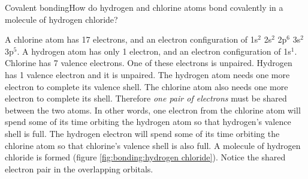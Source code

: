 \begin{wex}{Covalent bonding}{How do hydrogen and chlorine atoms bond covalently in a molecule of hydrogen chloride?}{
A chlorine atom has 17 electrons, and an electron configuration of 1s$^{2}$ 2s$^{2}$ 2p$^{6}$ 3s$^{2}$ 3p$^{5}$. A hydrogen atom has only 1 electron, and an electron configuration of 1s$^{1}$.
Chlorine has 7 valence electrons. One of these electrons is unpaired. Hydrogen has 1 valence electron and it is unpaired.
The hydrogen atom needs one more electron to complete its valence shell. The chlorine atom also needs one more electron to complete its shell. Therefore \textit{one pair of electrons} must be shared between the two atoms. In other words, one electron from the chlorine atom will spend some of its time orbiting the hydrogen atom so that hydrogen's valence shell is full. The hydrogen electron will spend some of its time orbiting the chlorine atom so that chlorine's valence shell is also full. A molecule of hydrogen chloride is formed (figure \ref{fig:bonding:hydrogen chloride}). Notice the shared electron pair in the overlapping orbitals.
\begin{figure}[H]
\begin{center}
\end{center}
\end{figure}}
\end{wex}
